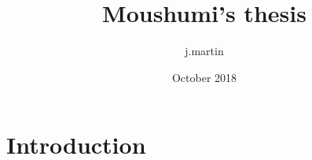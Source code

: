 \documentclass{article}
\title{Moushumi's thesis}
\author{j.martin }
\date{October 2018}
\begin{document}
\maketitle

\section{Introduction}
\end{document}
